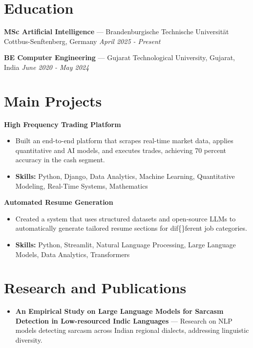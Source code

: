 \documentclass[a4paper,10pt]{article}
\begin{document}
\section*{Education}
\textbf{MSc Artificial Intelligence} — Brandenburgische Technische Universität Cottbus-Senftenberg, Germany \hfill \textit{April 2025 - Present}\par
\vspace{1.5pt}
\textbf{BE Computer Engineering} — Gujarat Technological University, Gujarat, India \hfill \textit{June 2020 - May 2024}\par

\section*{Main Projects}
\textbf{High Frequency Trading Platform}\par
\vspace{1pt}
\begin{itemize}
  \item Built an end-to-end platform that scrapes real-time market data, applies quantitative and AI models, and executes trades, achieving 70 percent accuracy in the cash segment.
  \item \textbf{Skills:} Python, Django, Data Analytics, Machine Learning, Quantitative Modeling, Real-Time Systems, Mathematics
\end{itemize}
\vspace{3pt}
\textbf{Automated Resume Generation}\par
\vspace{1pt}
\begin{itemize}
  \item Created a system that uses structured datasets and open-source LLMs to automatically generate tailored resume sections for dif\{\}ferent job categories.
  \item \textbf{Skills:} Python, Streamlit, Natural Language Processing, Large Language Models, Data Analytics, Transformers
\end{itemize}

\section*{Research and Publications}
\begin{itemize}
\item \textbf{An Empirical Study on Large Language Models for Sarcasm Detection in Low-resourced Indic Languages} — Research on NLP models detecting sarcasm across Indian regional dialects, addressing linguistic diversity.
\end{itemize}
\end{document}
